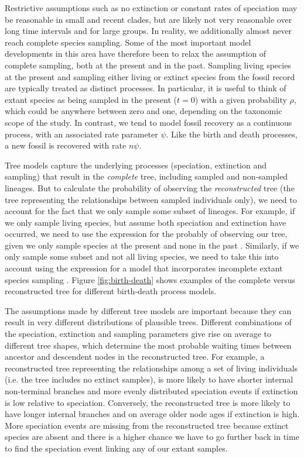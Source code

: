 Restrictive assumptions such as no extinction or constant rates of speciation may be reasonable in small and recent clades, but are likely not very reasonable over long time intervals and for large groups.
In reality, we additionally almost never reach complete species sampling.
Some of the most important model developments in this area have therefore been to relax the assumption of complete sampling, both at the present and in the past.
Sampling living species at the present and sampling either living or extinct species from the fossil record are typically treated as distinct processes.
In particular, it is useful to think of extant species as being sampled in the present ($t=0$) with a given probability $\rho$, which could be anywhere between zero and one, depending on the taxonomic scope of the study.
In contrast, we tend to model fossil recovery as a continuous process, with an associated rate parameter $\psi$. Like the birth and death processes, a new fossil is recovered with rate $n\psi$.

Tree models capture the underlying processes (speciation, extinction and sampling) that result in the \textit{complete} tree, including sampled and non-sampled lineages. But to calculate the probability of observing the  \textit{reconstructed} tree (the tree representing the relationships between sampled individuals only), we need to account for the fact that we only sample some subset of lineages.
For example, if we only sample living species, but assume both speciation and extinction have occurred, we need to use the expression for the probably of observing our tree, given we only sample species at the present and none in the past \citep{Thompson1975,Gernhard2008, Stadler2009}.  Similarly, if we only sample some subset and not all living species, we need to take this into account using the expression for a model that incorporates incomplete extant species sampling \citep{Yang1997,Stadler2009}.
Figure \ref{fig:birth-death} shows examples of the complete versus reconstructed tree for different birth-death process models.


The assumptions made by different tree models are important because they can result in very different distributions of plausible trees.
Different combinations of the speciation, extinction and sampling parameters give rise on average to different tree shapes, which determine the most probable waiting times between ancestor and descendent nodes 
in the reconstructed tree.
For example, a reconstructed tree representing the relationships among a set of living individuals (i.e. the tree includes no extinct samples),  
 is more likely to have shorter internal non-terminal branches and more evenly distributed speciation events if extinction is low relative to speciation.
Conversely, the reconstructed tree is more likely to have longer internal branches and on average older node ages if extinction is high.
More speciation events are missing from the reconstructed tree because extinct species are absent and there is a higher chance we have to go further back in time to find the speciation event linking any of our extant samples.


